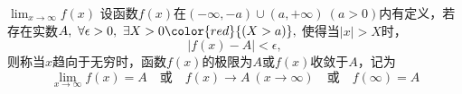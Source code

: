\documentclass[]{beamer}
\begin{document}
\begin{frame}{$\displaystyle\lim_{x\rightarrow\infty}f(x)$}
    设函数$f(x)$在$(-\infty,-a)\cup(a,+\infty)\ (a>0)$内有定义，若存在实数$A,\ \forall \epsilon>0,
    \ \exists X>0\color{red}{(X>a)},\ $使得当$|x|>X$时，
    \[
    |f(x)-A|<\epsilon,
    \]
    则称当$x$趋向于无穷时，函数$f(x)$的极限为$A$或$f(x)$收敛于$A$，记为
    \[
    \lim_{x\rightarrow\infty}f(x)=A\quad\text{或}\quad f(x)\rightarrow A\ (x\rightarrow\infty)\quad\text{或}\quad f(\infty)=A
    \]
\end{frame}






\end{document}
